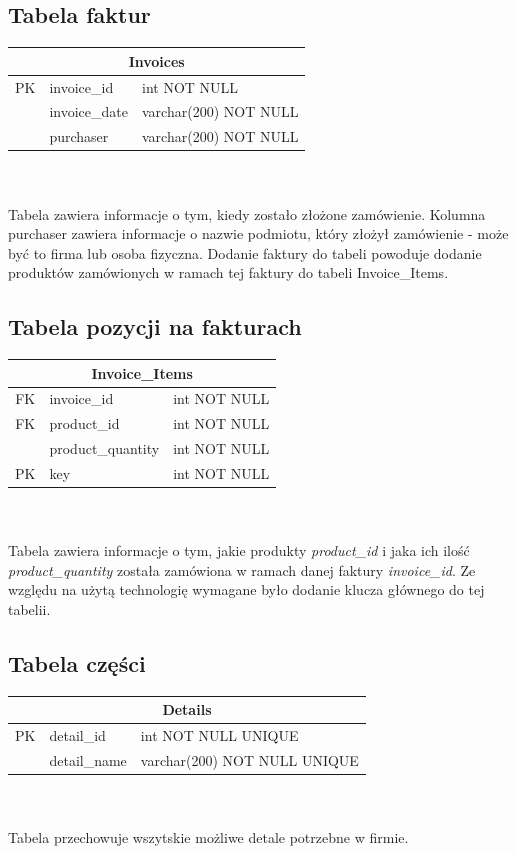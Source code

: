 \documentclass{article}
\begin{document}
\subsection{Tabela faktur}
\begin{tabular}{|c|l|l|} \hline
   \multicolumn{3}{|c|}{Invoices}             \\ \hline
   PK & invoice\_id   & int NOT NULL          \\ \hline
      & invoice\_date & varchar(200) NOT NULL \\
      & purchaser     & varchar(200) NOT NULL \\ \hline
\end{tabular} \\
\vspace{0.3cm} \\
Tabela zawiera informacje o tym, kiedy zostało złożone zamówienie.
Kolumna purchaser zawiera informacje o nazwie podmiotu, który złożył zamówienie
- może być to firma lub osoba fizyczna. Dodanie faktury do tabeli powoduje
dodanie produktów zamówionych w ramach tej faktury do tabeli Invoice\_Items.

\subsection{Tabela pozycji na fakturach}
\begin{tabular}{|c|l|l|} \hline
   \multicolumn{3}{|c|}{Invoice\_Items}  \\ \hline
   FK & invoice\_id       & int NOT NULL \\ \hline
   FK & product\_id       & int NOT NULL \\
      & product\_quantity & int NOT NULL \\
   PK & key               & int NOT NULL \\ \hline
\end{tabular} \\
\vspace{0.3cm} \\
Tabela zawiera informacje o tym, jakie produkty \textit{product\_id} i jaka ich
ilość \textit{product\_quantity} została zamówiona w ramach danej faktury \textit{invoice\_id}.
Ze względu na użytą technologię wymagane było dodanie klucza głównego do tej tabelii.
\subsection{Tabela części}
\begin{tabular}{|c|l|l|} \hline
   \multicolumn{3}{|c|}{Details}                    \\ \hline
   PK & detail\_id   & int NOT NULL UNIQUE          \\ \hline
      & detail\_name & varchar(200) NOT NULL UNIQUE \\ \hline
\end{tabular} \\
\vspace{0.3cm} \\
Tabela przechowuje wszytskie możliwe detale potrzebne w firmie.
\end{document}
